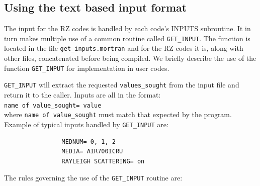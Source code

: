 \documentclass[12pt,twoside]{article}  %
\begin{document}
\newpage
\subsection{Using the text based input format}
\label{UNIF}

The input for the RZ codes is handled by each code's
INPUTS subroutine. It in turn makes multiple use of a common routine called
\verb+GET_INPUT+.
The function is located in the file \verb+get_inputs.mortran+
and for the RZ codes it is, along with other files, concatenated before
being compiled.
We briefly describe the use of the function \verb+GET_INPUT+
for implementation in user codes.

\verb+GET_INPUT+ will extract the requested
\verb+values_sought+ from the input file and return it to the
caller. Inputs are all in the format:\\
 \verb+name of value_sought= value+\\
where \verb+name of value_sought+ must match that expected by the
program.  Example of typical inputs handled by \verb+GET_INPUT+ are:
\begin{verbatim}
                MEDNUM= 0, 1, 2
                MEDIA= AIR700ICRU
                RAYLEIGH SCATTERING= on
\end{verbatim}
The rules governing the use of the {\tt GET\_INPUT} routine are:
\end{document}
